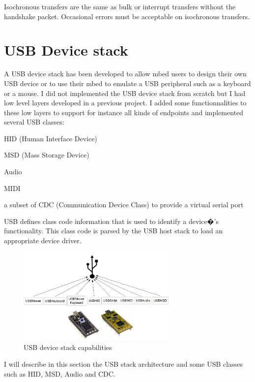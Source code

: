 \documentclass[pdftex,10pt,a4paper]{report}
\newenvironment{packed_item}{
\begin{itemize}
  \setlength{\itemsep}{1pt}
  \setlength{\parskip}{0pt}
  \setlength{\parsep}{0pt}
}{\end{itemize}}
\begin{document}
Isochronous transfers are the same as bulk or interrupt transfers without the handshake packet. Occasional errors must be acceptable on isochronous transfers.



\newpage
\section{USB Device stack}
A USB device stack has been developed to allow mbed users to design their own USB device or to use their mbed to emulate a USB peripheral such as a keyboard or a mouse. I did not implemented the USB device stack from scratch but I had low level layers developed in a previous project. I added some functionnalities to these low layers to support for instance all kinds of endpoints and implemented several USB classes:
\begin{packed_item}
	\item HID (Human Interface Device)
	\item MSD (Mass Storage Device)
	\item Audio
	\item MIDI
	\item a subset of CDC (Communication Device Class) to provide a virtual serial port
\end{packed_item}

USB defines class code information that is used to identify a device�'s functionality. This class code is parsed by the USB host stack to load an appropriate device driver.

\begin{figure}[h!]
		\centering
		\includegraphics[width=0.7\textwidth]{./usb_capa1.jpg}
		\caption{USB device stack capabilities}
		\label{USB device stack capabilities}
\end{figure}

I will describe in this section the USB stack architecture and some USB classes such as HID, MSD, Audio and CDC.
\end{document}
